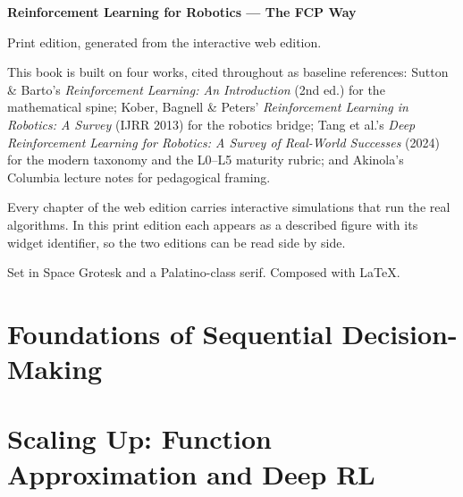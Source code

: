 \documentclass[11pt, twoside, openright]{book}
\begin{document}
\cleardoublepage
\thispagestyle{empty}
\vspace*{\fill}
\noindent
{\fontsize{9}{13}\selectfont\color{shInkSecondary}
\textbf{Reinforcement Learning for Robotics --- The FCP Way}\par
\vspace{5pt}
Print edition, generated from the interactive web edition.\par
\vspace{9pt}
This book is built on four works, cited throughout as baseline references:
Sutton \& Barto's \emph{Reinforcement Learning: An Introduction} (2nd ed.) for the
mathematical spine; Kober, Bagnell \& Peters' \emph{Reinforcement Learning in
Robotics: A Survey} (IJRR 2013) for the robotics bridge; Tang et al.'s
\emph{Deep Reinforcement Learning for Robotics: A Survey of Real-World Successes}
(2024) for the modern taxonomy and the L0--L5 maturity rubric; and Akinola's
Columbia lecture notes for pedagogical framing.\par
\vspace{9pt}
Every chapter of the web edition carries interactive simulations that run the
real algorithms. In this print edition each appears as a described figure with
its widget identifier, so the two editions can be read side by side.\par
\vspace{9pt}
{\color{shInkMuted}Set in Space Grotesk and a Palatino-class serif.
Composed with \LaTeX.}\par}
\vspace*{\fill}

\cleardoublepage
\pagestyle{fancy}
\setcounter{tocdepth}{1}
\renewcommand{\contentsname}{Contents}
\tableofcontents

\mainmatter

\part{Foundations of Sequential Decision-Making}








\part{Scaling Up: Function Approximation and Deep RL}





\end{document}

